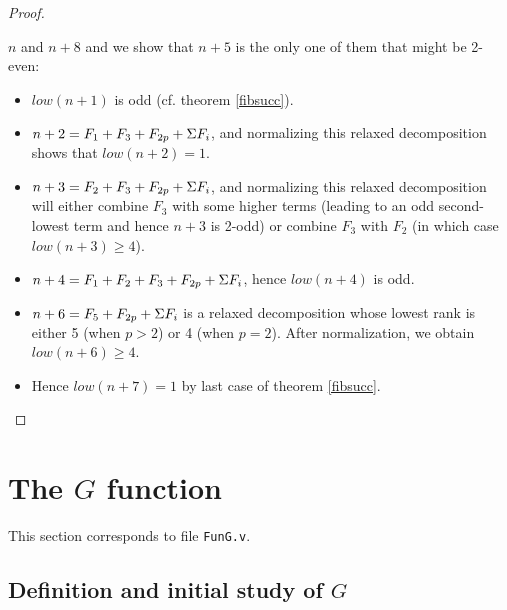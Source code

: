 \documentclass[a4paper,11pt]{article}
\begin{document}
\begin{proof}
\begin{enumerate}
  $n$ and $n+8$ and we show that $n+5$ is the only one of them that
  might be 2-even:
  \begin{itemize}
  \item $low(n+1)$ is odd (cf. theorem \ref{fibsucc}).
  \item $n+2 = F_1+F_3+F_{2p}+\Sigma F_i$, and normalizing this
    relaxed decomposition shows that $low(n+2)=1$.
  \item $n+3 = F_2+F_3+F_{2p}+\Sigma F_i$, and normalizing this
    relaxed decomposition will either combine $F_3$ with some
    higher terms (leading to an odd second-lowest term and
    hence $n+3$ is 2-odd) or combine $F_3$ with $F_2$ (in which
    case $low(n+3)\ge 4$).
  \item $n+4 = F_1+F_2+F_3+F_{2p}+\Sigma F_i$, hence $low(n+4)$ is
    odd.
  \item $n+6 = F_5+F_{2p}+\Sigma F_i$ is a relaxed decomposition
   whose lowest rank is either 5 (when $p>2$) or 4 (when $p=2$).
   After normalization, we obtain $low(n+6)\ge 4$.
  \item Hence $low(n+7)=1$ by last case of theorem \ref{fibsucc}.
  \end{itemize}
\end{enumerate}
\end{proof}

\section{The $G$ function}

This section corresponds to file {\tt FunG.v}.

\subsection{Definition and initial study of $G$}
\end{document}
